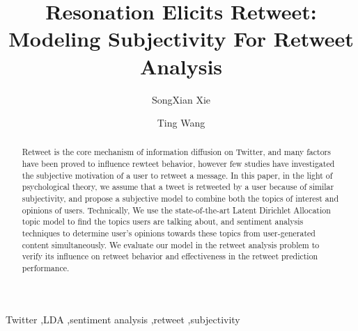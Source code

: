\documentclass[preprint,times]{elsarticle}
\begin{document}
\title{Resonation Elicits Retweet: Modeling Subjectivity For Retweet Analysis}

\author[rvf]{SongXian Xie}

\author[rvf]{Ting Wang}

\address[rvf]{Department of Computer, National University of Defense Technology, \\Changsha, China, 410073}

\begin{abstract}
Retweet is the core mechanism of information diffusion on Twitter, and many factors have been proved to influence rewteet behavior, however few studies have investigated the subjective motivation of a user to retweet a message.
In this paper, in the light of psychological theory, we assume that a tweet is retweeted by a user because of similar subjectivity, and propose a subjective model to combine both the topics of interest and opinions of users. Technically, We use the state-of-the-art Latent Dirichlet Allocation topic model to find the topics users are talking about, and sentiment analysis techniques to determine user's opinions towards these topics from user-generated content simultaneously. 
We evaluate our model in the retweet analysis problem to verify its influence on retweet behavior and effectiveness in the retweet prediction performance. 
\end{abstract}
\begin{keyword}
Twitter \sep LDA \sep sentiment analysis \sep retweet \sep subjectivity
\end{keyword}
\maketitle
\end{document}
